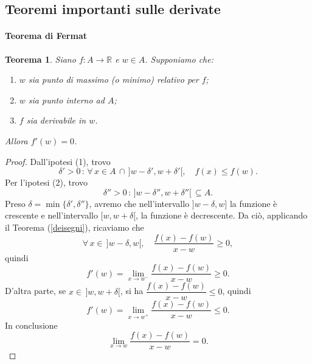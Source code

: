 \documentclass{article}
\theoremstyle{plain}
\newtheorem{thm}{Teorema}[section]
\theoremstyle{definition}
\theoremstyle{remark}
\begin{document}
\subsection{Teoremi importanti sulle derivate}

\vspace{10pt}

\paragraph{Teorema di Fermat}
\begin{bxthm}
\begin{thm}
    Siano $f:A\to\mathbb{R}$ e $w\in A$.
    Supponiamo che:
    \begin{enumerate}
        \item $w$ sia punto di massimo (o minimo) relativo per $f$;
        \item $w$ sia punto interno ad $A$;
        \item $f$ sia derivabile in $w$.
    \end{enumerate}
    Allora $f'(w)=0$.
\end{thm}
\end{bxthm}
\begin{proof}
    Dall'ipotesi (1), trovo 
    \[\delta'>0\,:\,\forall\,x\in A\,\cap\,]w-\delta',w+\delta'[,\quad f(x)\leq f(w).\]
    Per l'ipotesi (2), trovo 
    \[\delta''>0\,:\,]w-\delta'',w+\delta''[\,\subseteq A.\]
    Preso $\delta=\min\{\delta',\delta''\}$, avremo che nell'intervallo $]w-\delta,w]$ la funzione è crescente e nell'intervallo $[w,w+\delta[$, 
    la funzione è decrescente.
    Da ciò, applicando il Teorema (\ref{deisegni}), ricaviamo che 
    \[\forall\,x\in\, ]w-\delta,w[,\quad\dfrac{f(x)-f(w)}{x-w}\geq0,\] 
    quindi 
    \[f'(w)=\lim_{x\to w^-}\dfrac{f(x)-f(w)}{x-w}\geq0.\]
    D'altra parte, se $x\in\,]w,w+\delta[$, si ha $\dfrac{f(x)-f(w)}{x-w}\leq0$, quindi 
    \[f'(w)=\lim_{x\to w^+}\dfrac{f(x)-f(w)}{x-w}\leq0.\]
    In conclusione 
    \[\lim_{x\to w}\dfrac{f(x)-f(w)}{x-w}=0.\]
\end{proof}

\vspace{10pt}
\end{document}
